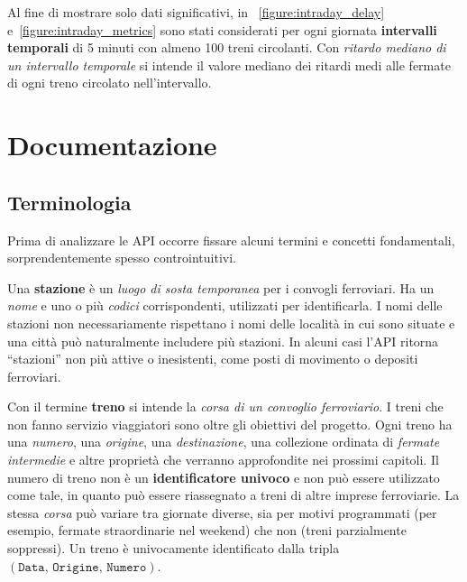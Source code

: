 \documentclass[12pt,italian]{report}
\begin{document}
Al fine di mostrare solo dati significativi, in
\figurename~\ref{figure:intraday_delay}
e~\ref{figure:intraday_metrics} sono stati considerati per ogni
giornata \textbf{intervalli temporali} di 5 minuti con almeno 100
treni circolanti.  Con \textit{ritardo mediano di un intervallo
    temporale} si intende il valore mediano dei ritardi medi alle
fermate di ogni treno circolato nell'intervallo.


\printbibliography


\appendix

\chapter{Documentazione}
\label{documentazione}

\section{Terminologia}
\label{terminologia}

Prima di analizzare le API occorre fissare alcuni termini e concetti
fondamentali, sorprendentemente spesso controintuitivi.

Una \textbf{stazione} è un \textit{luogo di sosta temporanea} per i
convogli ferroviari.  Ha un \textit{nome} e uno o più \textit{codici}
corrispondenti, utilizzati per identificarla.  I nomi delle stazioni
non necessariamente rispettano i nomi delle località in cui sono
situate e una città può naturalmente includere più stazioni.  In
alcuni casi l'API ritorna ``stazioni'' non più attive o inesistenti,
come posti di movimento o depositi ferroviari.

Con il termine \textbf{treno} si intende la \textit{corsa di un
    convoglio ferroviario}.  I treni che non fanno servizio
viaggiatori sono oltre gli obiettivi del progetto.  Ogni treno ha una
\textit{numero}, una \textit{origine}, una \textit{destinazione}, una
collezione ordinata di \textit{fermate intermedie} e altre proprietà
che verranno approfondite nei prossimi capitoli.  Il numero di treno
non è un \textbf{identificatore univoco} e non può essere utilizzato
come tale, in quanto può essere riassegnato a treni di altre imprese
ferroviarie.  La stessa \textit{corsa} può variare tra giornate
diverse, sia per motivi programmati (per esempio, fermate
straordinarie nel weekend) che non (treni parzialmente soppressi).  Un
treno è univocamente identificato dalla tripla
$(\texttt{Data}, \, \texttt{Origine}, \, \texttt{Numero})$.
\end{document}
